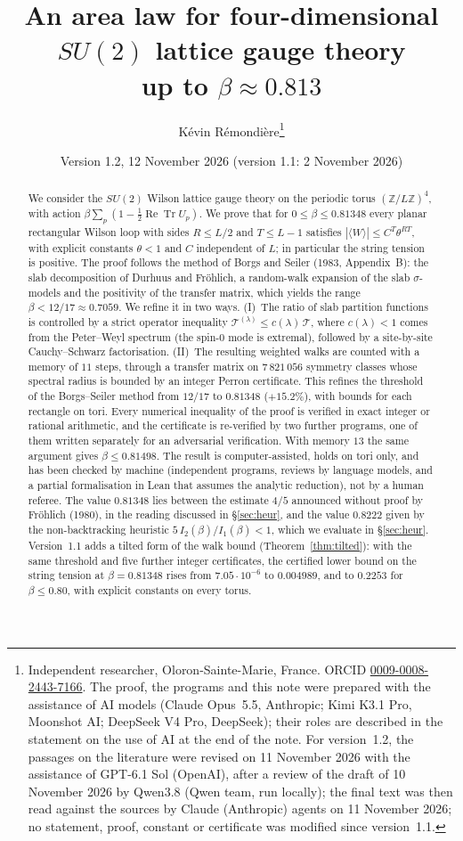 \documentclass[11pt,a4paper]{article}
\title{An area law for four-dimensional $SU(2)$ lattice gauge theory\\ up to $\beta\approx0.813$}
\author{K\'evin R\'emondi\`ere\thanks{Independent researcher, Oloron-Sainte-Marie, France. ORCID
\href{https://orcid.org/0009-0008-2443-7166}{0009-0008-2443-7166}. The proof, the programs and this note were prepared with
the assistance of AI models (Claude Opus~5.5, Anthropic; Kimi K3.1 Pro, Moonshot AI; DeepSeek V4 Pro, DeepSeek); their roles are
described in the statement on the use of AI at the end of the note. For version~1.2, the passages on the literature were revised on 11 November 2026 with the assistance of GPT-6.1 Sol (OpenAI), after a review of the draft of 10 November 2026 by Qwen3.8 (Qwen team, run locally); the final text was then read against the sources by Claude (Anthropic) agents on 11 November 2026; no statement, proof, constant or certificate was modified since version~1.1.}}
\date{Version 1.2, 12 November 2026 (version 1.1: 2 November 2026)}
\theoremstyle{plain}
\theoremstyle{remark}
\numberwithin{equation}{section}
\newcommand{\Z}{\mathbb{Z}}
\newcommand{\ReTr}{\operatorname{Re}\operatorname{Tr}}
\newcommand{\cT}{\mathcal{T}}
\begin{document}
\maketitle

\begin{abstract}
We consider the $SU(2)$ Wilson lattice gauge theory on the periodic torus $(\Z/L\Z)^4$, with action
$\beta\sum_p(1-\tfrac12\ReTr U_p)$. We prove that for $0\le\beta\le0.81348$ every planar rectangular Wilson loop with sides
$R\le L/2$ and $T\le L-1$ satisfies $|\langle W\rangle|\le C^T\theta^{RT}$, with explicit constants $\theta<1$ and $C$ independent
of $L$; in particular the string tension is positive. The proof follows the method of Borgs and Seiler (1983, Appendix~B): the slab
decomposition of Durhuus and Fr\"ohlich, a random-walk expansion of the slab $\sigma$-models and the positivity of the transfer
matrix, which yields the range $\beta<12/17\approx0.7059$. We refine it in two ways. (I)~The ratio of slab partition
functions is controlled by a strict operator inequality $\cT^{(\lambda)}\le c(\lambda)\,\cT$, where $c(\lambda)<1$ comes from the
Peter--Weyl spectrum (the spin-$0$ mode is extremal), followed by a site-by-site Cauchy--Schwarz factorisation. (II)~The resulting
weighted walks are counted with a memory of $11$ steps, through a transfer matrix on $7\,821\,056$ symmetry classes whose spectral
radius is bounded by an integer Perron certificate. This refines the threshold of the Borgs--Seiler method from $12/17$ to
$0.81348$ ($+15.2\%$), with bounds for each rectangle on tori. Every numerical inequality of the proof is verified in exact integer or rational
arithmetic, and the certificate is re-verified by two further programs, one of them written separately for an adversarial
verification. With memory $13$ the same argument gives
$\beta\le0.81498$. The result is computer-assisted, holds on tori only, and has been checked by machine (independent programs,
reviews by language models, and a partial formalisation in Lean that assumes the analytic reduction), not by a human referee. The value $0.81348$ lies between the estimate $4/5$ announced without proof by
Fr\"ohlich (1980), in the reading discussed in \S\ref{sec:heur}, and the value $0.8222$ given by the non-backtracking heuristic
$5\,I_2(\beta)/I_1(\beta)<1$, which we evaluate in \S\ref{sec:heur}. Version~1.1 adds a tilted form of the walk bound
(Theorem~\ref{thm:tilted}): with the same threshold and five further integer certificates, the certified lower bound on the string
tension at $\beta=0.81348$ rises from $7.05\cdot10^{-6}$ to $0.004989$, and to $0.2253$ for $\beta\le0.80$, with explicit constants on
every torus.
\end{abstract}
\end{document}

